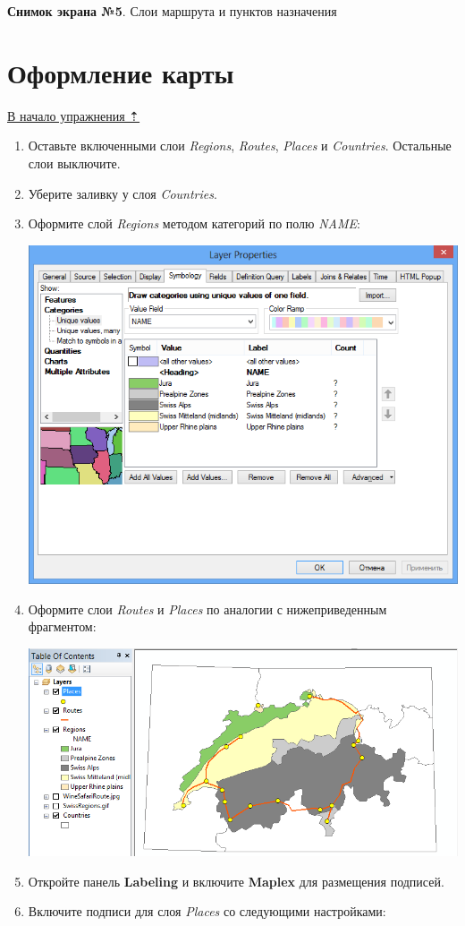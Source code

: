 \documentclass[12pt,]{book}
\begin{document}
\textbf{Снимок экрана №5}. Слои маршрута и пунктов назначения

\hypertarget{map-ref-general-design}{%
\section{Оформление карты}\label{map-ref-general-design}}

\protect\hyperlink{map-ref-general}{В начало упражнения ⇡}

\begin{enumerate}
\def\labelenumi{\arabic{enumi}.}
\item
  Оставьте включенными слои \emph{Regions}, \emph{Routes}, \emph{Places} и \emph{Countries}. Остальные слои выключите.
\item
  Уберите заливку у слоя \emph{Countries}.
\item
  Оформите слой \emph{Regions} методом категорий по полю \emph{NAME}:

  \includegraphics{images/Ex05/image30.png}
\item
  Оформите слои \emph{Routes} и \emph{Places} по аналогии с нижеприведенным фрагментом:

  \includegraphics{images/Ex05/image31.png}
\item
  Откройте панель \textbf{Labeling} и включите \textbf{Maplex} для размещения подписей.
\item
  Включите подписи для слоя \emph{Places} со следующими настройками:


\end{enumerate}
\end{document}
